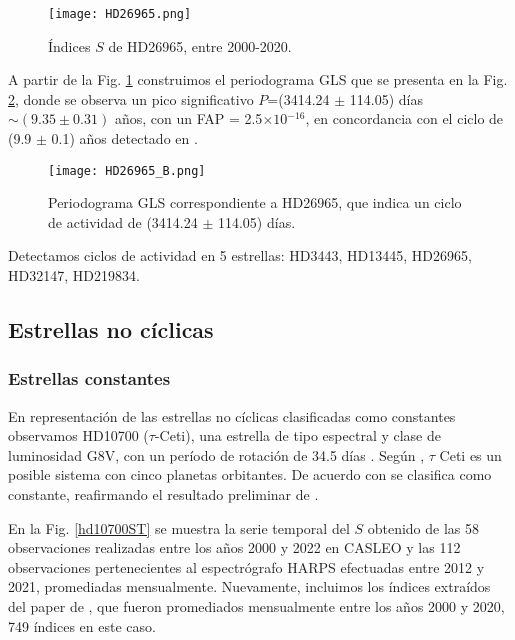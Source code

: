 \documentclass[baaa]{baaa}
\begin{document}
\begin{figure}[ht!]
\centering
\texttt{[image: HD26965.png]}
\caption{Índices $S$ de HD26965, entre 2000-2020. 
}
\label{hd26965ST}
\end{figure}


A partir de la Fig. \ref{hd26965ST} construimos el periodograma GLS que se presenta en la Fig. \ref{hd26965P}, donde se observa un pico significativo $P$=(3414.24 $\pm$ 114.05) días $\sim (9.35 \pm 0.31)$ años, con un FAP = 2.5$\times1$0$^{-16}$, en concordancia con el ciclo de (9.9 $\pm$ 0.1) años detectado en \cite{Baum22}.

\begin{figure}[ht!]
\centering
\texttt{[image: HD26965\_B.png]}
\caption{Periodograma GLS correspondiente a HD26965, que indica un ciclo de actividad de (3414.24 $\pm$ 114.05) días.}
\label{hd26965P}
\end{figure}

Detectamos ciclos de actividad en 5 estrellas: HD3443, HD13445, HD26965, HD32147, HD219834.

\subsection{Estrellas no cíclicas}

\subsubsection{Estrellas constantes}

En representación de las estrellas no cíclicas clasificadas como constantes observamos HD10700 ($\tau$-Ceti), una estrella de tipo espectral y clase de luminosidad G8V, con un período de rotación de 34.5 días \citep{Cincunegui07}. Según \cite{Tuomi13}, $\tau$ Ceti es un posible sistema con cinco planetas orbitantes. De acuerdo con \cite{Baum22} se clasifica como constante, reafirmando el resultado preliminar de \cite{Baliunas95}.

En la Fig. \ref{hd10700ST} se muestra la serie temporal del $S$ obtenido de las 58 observaciones realizadas entre los años 2000 y 2022 en CASLEO y las 112 observaciones pertenecientes al espectrógrafo HARPS efectuadas entre 2012 y 2021, promediadas mensualmente. Nuevamente, incluimos los índices extraídos del paper de \cite{Baum22}, que fueron promediados mensualmente entre los años 2000 y 2020, 749 índices en este caso.
\end{document}

